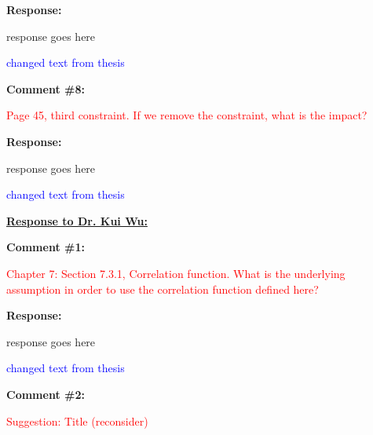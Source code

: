 \documentclass[journal]{IEEEtran}
\begin{document}
\vspace{10pt}
\textbf{Response:}
\begin{adjustwidth}{2.5em}{0pt}
response goes here

\vspace{10pt}
\noindent\textcolor{blue}{changed text from thesis}
\end{adjustwidth}


\vspace{30pt}
\textbf{Comment \#8:}
\begin{adjustwidth}{2.5em}{0pt}
\singlespacing \vspace{-10pt}
\textcolor{red}{Page 45, third constraint. If we remove the constraint, what is the impact?}
\end{adjustwidth}

\vspace{10pt}
\textbf{Response:}
\begin{adjustwidth}{2.5em}{0pt}
response goes here

\vspace{10pt}
\noindent\textcolor{blue}{changed text from thesis}
\end{adjustwidth} 
 
 
 
 
 
\vspace{50pt}
  \Large
\noindent \textbf{\underline{Response to Dr. Kui Wu:}}
 \large

\vspace{10pt}
\textbf{Comment \#1:}
\begin{adjustwidth}{2.5em}{0pt}
\singlespacing \vspace{-10pt}
\textcolor{red}{Chapter 7: Section 7.3.1, Correlation function. What is the underlying assumption in order to use the correlation function defined here?}
\end{adjustwidth}

\vspace{10pt}
\textbf{Response:}
\begin{adjustwidth}{2.5em}{0pt}
response goes here

\vspace{10pt}
\noindent\textcolor{blue}{changed text from thesis}
\end{adjustwidth}


\vspace{30pt}
\textbf{Comment \#2:}
\begin{adjustwidth}{2.5em}{0pt}
\singlespacing \vspace{-10pt}
\textcolor{red}{Suggestion: Title (reconsider)}
\end{adjustwidth}
\end{document}
